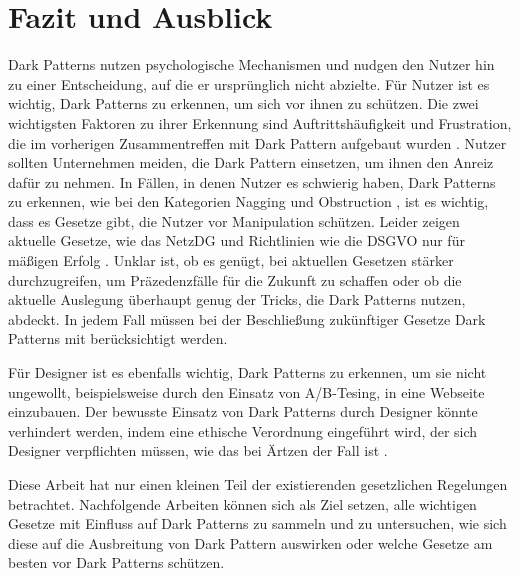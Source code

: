 \documentclass[conference,compsoc,final,a4paper]{IEEEtran}
\begin{document}
\section{Fazit und Ausblick}
Dark Patterns nutzen psychologische Mechanismen und nudgen den Nutzer hin zu einer Entscheidung, auf die er ursprünglich nicht abzielte. Für Nutzer ist es wichtig, Dark Patterns zu erkennen, um sich vor ihnen zu schützen. Die zwei wichtigsten Faktoren zu ihrer Erkennung sind Auftrittshäufigkeit und Frustration, die im vorherigen Zusammentreffen mit Dark Pattern aufgebaut wurden \autocite{M.Bhoot2020}. Nutzer sollten Unternehmen meiden, die Dark Pattern einsetzen, um ihnen den Anreiz dafür zu nehmen. In Fällen, in denen Nutzer es schwierig haben, Dark Patterns zu erkennen, wie bei den Kategorien Nagging und Obstruction \autocites{Gray_2018}{M.Bhoot2020}, ist es wichtig, dass es Gesetze gibt, die Nutzer vor Manipulation schützen. Leider zeigen aktuelle Gesetze, wie das \ac{NetzDG} und Richtlinien wie die \ac{DSGVO} nur für mäßigen Erfolg \autocites{Nouwens2020}{Soe2020}. Unklar ist, ob es genügt, bei aktuellen Gesetzen stärker durchzugreifen, um Präzedenzfälle für die Zukunft zu schaffen \autocite{Rieger2020} oder ob die aktuelle Auslegung überhaupt genug der Tricks, die Dark Patterns nutzen, abdeckt. In jedem Fall müssen bei der Beschließung zukünftiger Gesetze Dark Patterns mit berücksichtigt werden.

Für Designer ist es ebenfalls wichtig, Dark Patterns zu erkennen, um sie nicht ungewollt, beispielsweise durch den Einsatz von A/B-Tesing, in eine Webseite einzubauen. Der bewusste Einsatz von Dark Patterns durch Designer könnte verhindert werden, indem eine ethische Verordnung eingeführt wird, der sich Designer verpflichten müssen, wie das bei Ärtzen der Fall ist \autocite{Gray_2018}.

Diese Arbeit hat nur einen kleinen Teil der existierenden gesetzlichen Regelungen betrachtet. Nachfolgende Arbeiten können sich als Ziel setzen, alle wichtigen Gesetze mit Einfluss auf Dark Patterns zu sammeln und zu untersuchen, wie sich diese auf die Ausbreitung von Dark Pattern auswirken oder welche Gesetze am besten vor Dark Patterns schützen.


\end{document}
